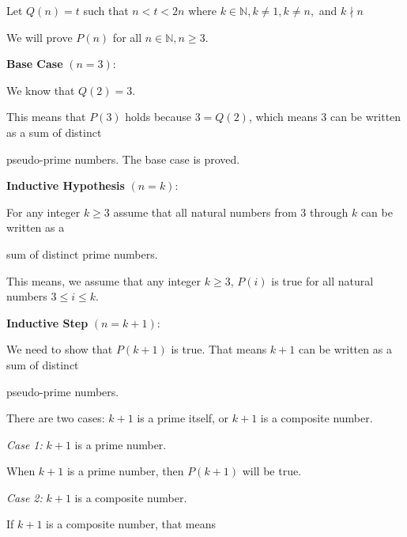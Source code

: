 \documentclass{article} %
\begin{document}
    Let $Q(n) = t$ such that $n < t < 2n$ where $k \in \mathbb{N}, k \neq 1, k \neq n,$ and $k \nmid n$ 

    We will prove $P(n)$ for all $n \in \mathbb{N}, n \geq 3$.

    \textbf{Base Case} $(n = 3)$:

    We know that $Q(2) = 3$.

    This means that $P(3)$ holds because $3 = Q(2)$, which means 3 can be written as a sum of distinct 
    
    pseudo-prime numbers. The base case is proved.

    \textbf{Inductive Hypothesis} $(n = k)$:

    For any integer $k \geq 3$ assume that all natural numbers from 3 through $k$ can be written as a 
    
    sum of distinct prime numbers. 

    This means, we assume that any integer $k \geq 3$, $P(i)$ is true for all natural numbers $3 \leq i \leq k$.

    \textbf{Inductive Step} $(n = k + 1)$:

    We need to show that $P(k + 1)$ is true. That means $k + 1$ can be written as a sum of distinct 
    
    pseudo-prime numbers.

    There are two cases: $k + 1$ is a prime itself, or $k + 1$ is a composite number.

    \textit{Case 1:} $k + 1$ is a prime number.

    \tabto{1cm} When $k + 1$ is a prime number, then $P(k + 1)$ will be true.

    \textit{Case 2:} $k + 1$ is a composite number.

    \tabto{1cm} If $k + 1$ is a composite number, that means 
\end{document}
